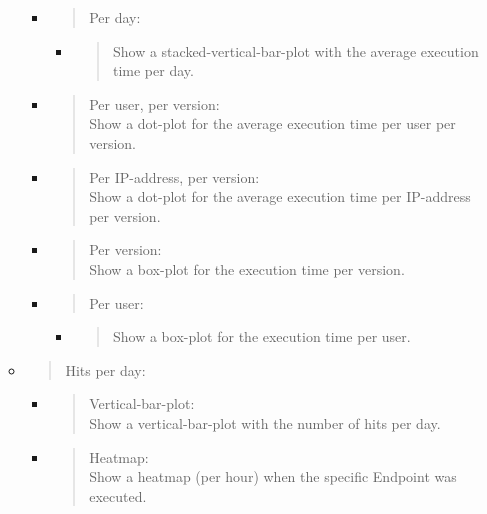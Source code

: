 \begin{itemize}
\begin{itemize}
    \begin{itemize}
    \item
      \begin{quote}
      Per day:
      \end{quote}

      \begin{itemize}
      \item
        \begin{quote}
        Show a stacked-vertical-bar-plot with the average execution time
        per day.
        \end{quote}
      \end{itemize}
    \item
      \begin{quote}
      Per user, per version:\\
      Show a dot-plot for the average execution time per user per
      version.
      \end{quote}
    \item
      \begin{quote}
      Per IP-address, per version:\\
      Show a dot-plot for the average execution time per IP-address per
      version.
      \end{quote}
    \item
      \begin{quote}
      Per version:\\
      Show a box-plot for the execution time per version.
      \end{quote}
    \item
      \begin{quote}
      Per user:
      \end{quote}

      \begin{itemize}
      \item
        \begin{quote}
        Show a box-plot for the execution time per user.
        \end{quote}
      \end{itemize}
    \end{itemize}
  \item
    \begin{quote}
    Hits per day:
    \end{quote}

    \begin{itemize}
    \item
      \begin{quote}
      Vertical-bar-plot:\\
      Show a vertical-bar-plot with the number of hits per day.
      \end{quote}
    \item
      \begin{quote}
      Heatmap:\\
      Show a heatmap (per hour) when the specific Endpoint was executed.
      \end{quote}
    \end{itemize}
  \end{itemize}
\end{itemize}


